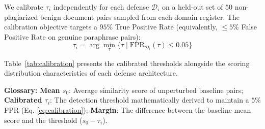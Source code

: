 \documentclass[conference,onecolumn,11pt]{IEEEtran}
\begin{document}
We calibrate $\tau_i$ independently for each defense $\mathcal{D}_i$ on a held-out set of $50$ non-plagiarized benign document pairs sampled from each domain register. The calibration objective targets a $95\%$ True Positive Rate (equivalently, $\le 5\%$ False Positive Rate on genuine paraphrase pairs):
\begin{equation}
    \tau_i = \arg\min_\tau \Big\{ \tau \;\Big|\; \text{FPR}_{\mathcal{D}_i}(\tau) \le 0.05 \Big\}
    \label{eq:calibration}
\end{equation}

Table~\ref{tab:calibration} presents the calibrated thresholds alongside the scoring distribution characteristics of each defense architecture.

\begin{table}[htbp]
\centering
\caption{Per-Architecture Calibrated Detection Thresholds ($\tau_i$) and Scoring Distribution Characteristics.}
\label{tab:calibration}
\vspace{1em}
\small \textbf{Glossary:} \textbf{Mean $s_0$}: Average similarity score of unperturbed baseline pairs; \textbf{Calibrated $\tau_i$}: The detection threshold mathematically derived to maintain a $5\%$ FPR (Eq. \ref{eq:calibration}); \textbf{Margin}: The difference between the baseline mean score and the threshold ($s_0 - \tau_i$).
\end{table}
\end{document}
